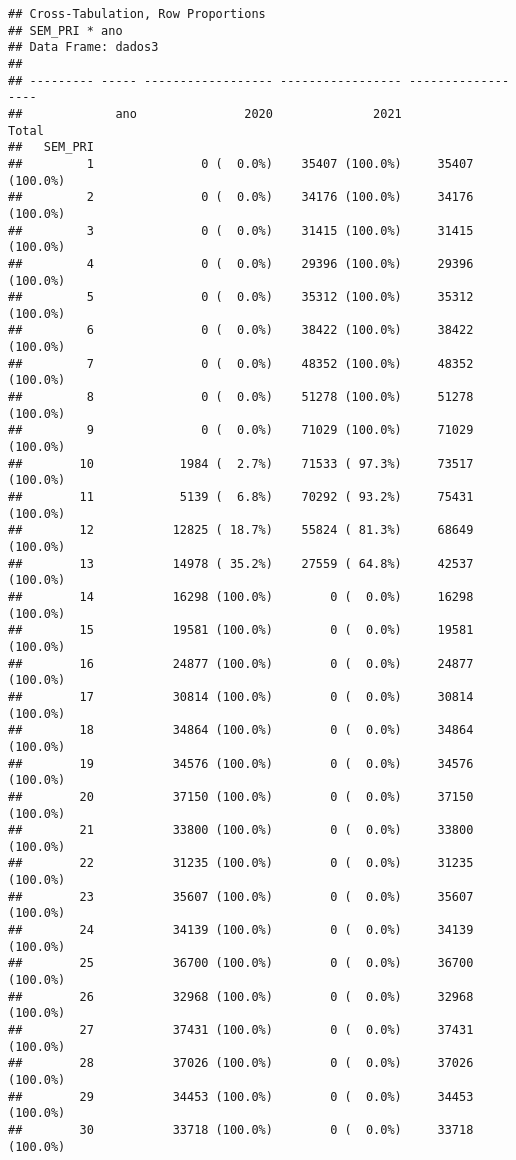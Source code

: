 \documentclass[
]{article}
\begin{document}
\begin{verbatim}
## Cross-Tabulation, Row Proportions  
## SEM_PRI * ano  
## Data Frame: dados3  
## 
## --------- ----- ------------------ ----------------- ------------------
##             ano               2020              2021              Total
##   SEM_PRI                                                              
##         1               0 (  0.0%)    35407 (100.0%)     35407 (100.0%)
##         2               0 (  0.0%)    34176 (100.0%)     34176 (100.0%)
##         3               0 (  0.0%)    31415 (100.0%)     31415 (100.0%)
##         4               0 (  0.0%)    29396 (100.0%)     29396 (100.0%)
##         5               0 (  0.0%)    35312 (100.0%)     35312 (100.0%)
##         6               0 (  0.0%)    38422 (100.0%)     38422 (100.0%)
##         7               0 (  0.0%)    48352 (100.0%)     48352 (100.0%)
##         8               0 (  0.0%)    51278 (100.0%)     51278 (100.0%)
##         9               0 (  0.0%)    71029 (100.0%)     71029 (100.0%)
##        10            1984 (  2.7%)    71533 ( 97.3%)     73517 (100.0%)
##        11            5139 (  6.8%)    70292 ( 93.2%)     75431 (100.0%)
##        12           12825 ( 18.7%)    55824 ( 81.3%)     68649 (100.0%)
##        13           14978 ( 35.2%)    27559 ( 64.8%)     42537 (100.0%)
##        14           16298 (100.0%)        0 (  0.0%)     16298 (100.0%)
##        15           19581 (100.0%)        0 (  0.0%)     19581 (100.0%)
##        16           24877 (100.0%)        0 (  0.0%)     24877 (100.0%)
##        17           30814 (100.0%)        0 (  0.0%)     30814 (100.0%)
##        18           34864 (100.0%)        0 (  0.0%)     34864 (100.0%)
##        19           34576 (100.0%)        0 (  0.0%)     34576 (100.0%)
##        20           37150 (100.0%)        0 (  0.0%)     37150 (100.0%)
##        21           33800 (100.0%)        0 (  0.0%)     33800 (100.0%)
##        22           31235 (100.0%)        0 (  0.0%)     31235 (100.0%)
##        23           35607 (100.0%)        0 (  0.0%)     35607 (100.0%)
##        24           34139 (100.0%)        0 (  0.0%)     34139 (100.0%)
##        25           36700 (100.0%)        0 (  0.0%)     36700 (100.0%)
##        26           32968 (100.0%)        0 (  0.0%)     32968 (100.0%)
##        27           37431 (100.0%)        0 (  0.0%)     37431 (100.0%)
##        28           37026 (100.0%)        0 (  0.0%)     37026 (100.0%)
##        29           34453 (100.0%)        0 (  0.0%)     34453 (100.0%)
##        30           33718 (100.0%)        0 (  0.0%)     33718 (100.0%)

\end{verbatim}
\end{document}
